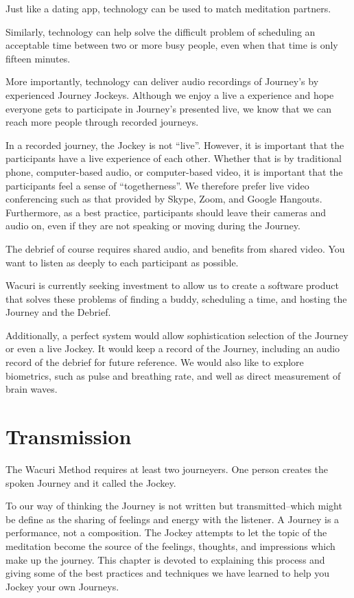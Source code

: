 \documentclass[12pt]{book}
\begin{document}
Just like a dating app, technology can be used to match meditation partners.

Similarly, technology can help solve the difficult problem of scheduling an
acceptable time between two or more busy people, even when that time is only fifteen minutes.

More importantly, technology can deliver audio recordings of Journey's by
experienced Journey Jockeys. Although we enjoy a live a experience and hope
everyone gets to participate in Journey's presented live, we know that we
can reach more people through recorded journeys.

In a recorded journey, the Jockey is not ``live''. However, it is
important that the participants have a live experience of each other.
Whether that is by traditional phone, computer-based audio, or computer-based
video, it is important that the participants feel a sense of ``togetherness''.
We therefore prefer live video conferencing such as that provided by Skype,
Zoom, and Google Hangouts. Furthermore, as a best practice, participants
should leave their cameras and audio on, even if they are not speaking or
moving during the Journey.

The debrief of course requires shared audio, and benefits from shared video.
You want to listen as deeply to each participant as possible.

Wacuri is currently seeking investment to allow us to create a software
product that solves these problems of finding a buddy, scheduling a time,
and hosting the Journey and the Debrief.

Additionally, a perfect system would allow sophistication selection of
the Journey or even a live Jockey. It would keep a record of the Journey,
including an audio record of the debrief for future reference. We would
also like to explore biometrics, such as pulse and breathing rate, and
well as direct measurement of brain waves.


\chapter{Transmission}


The Wacuri Method requires at least two journeyers. One person creates the spoken Journey and it called the Jockey.
					
To our way of thinking the Journey is not written but transmitted--which might be define as the sharing of feelings and energy with the listener. A Journey is a performance, not a composition. The Jockey attempts to let the topic of the meditation become the source of the feelings, thoughts, and impressions which make up the journey. This chapter is devoted to explaining this process and giving some of the best practices and techniques we have learned to help you Jockey your own Journeys.
					
\end{document}

